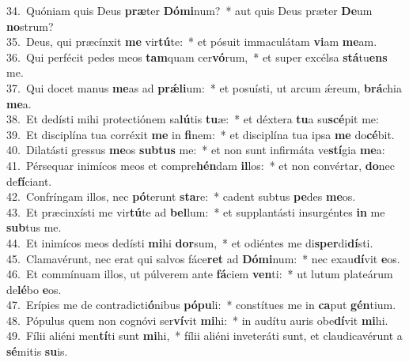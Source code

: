{34.~}Quóniam quis Deus \textbf{præ}ter \textbf{Dó}\textbf{mi}num?~* aut quis Deus præter \textbf{De}um \textbf{no}strum?\\
{35.~}Deus, qui præcínxit \textbf{me} vir\textbf{tú}te:~* et pósuit immaculátam \textbf{vi}am \textbf{me}am.\\
{36.~}Qui perfécit pedes meos \textbf{tam}quam cer\textbf{vó}rum,~* et super excélsa \textbf{stá}tu\textbf{ens} me.\\
{37.~}Qui docet manus \textbf{me}as ad \textbf{prǽ}\textbf{li}um:~* et posuísti, ut arcum ǽreum, \textbf{brá}chia \textbf{me}a.\\
{38.~}Et dedísti mihi protectiónem sa\textbf{lú}tis \textbf{tu}æ:~* et déxtera \textbf{tu}a su\textbf{scé}pit me:\\
{39.~}Et disciplína tua corréxit \textbf{me} in \textbf{fi}nem:~* et disciplína tua ipsa \textbf{me} do\textbf{cé}bit.\\
{40.~}Dilatásti gressus \textbf{me}os \textbf{sub}\textbf{tus} me:~* et non sunt infirmáta ve\textbf{stí}gia \textbf{me}a:\\
{41.~}Pérsequar inimícos meos et compre\textbf{hén}dam \textbf{il}los:~* et non convértar, \textbf{do}nec de\textbf{fí}ciant.\\
{42.~}Confríngam illos, nec \textbf{pó}terunt \textbf{sta}re:~* cadent subtus \textbf{pe}des \textbf{me}os.\\
{43.~}Et præcinxísti me vir\textbf{tú}te ad \textbf{bel}lum:~* et supplantásti insurgéntes \textbf{in} me \textbf{sub}tus me.\\
{44.~}Et inimícos meos dedísti \textbf{mi}hi \textbf{dor}sum,~* et odiéntes me di\textbf{sper}di\textbf{dí}sti.\\
{45.~}Clamavérunt, nec erat qui salvos fáce\textbf{ret} ad \textbf{Dó}\textbf{mi}num:~* nec exau\textbf{dí}vit \textbf{e}os.\\
{46.~}Et commínuam illos, ut púlverem ante \textbf{fá}ciem \textbf{ven}ti:~* ut lutum plateárum de\textbf{lé}bo \textbf{e}os.\\
{47.~}Erípies me de contradicti\textbf{ó}nibus \textbf{pó}\textbf{pu}li:~* constítues me in \textbf{ca}put \textbf{gén}tium.\\
{48.~}Pópulus quem non cognóvi ser\textbf{ví}vit \textbf{mi}hi:~* in audítu auris obe\textbf{dí}vit \textbf{mi}hi.\\
{49.~}Fílii aliéni men\textbf{tí}ti sunt \textbf{mi}hi,~* fílii aliéni inveteráti sunt, et claudicavérunt a \textbf{sé}mitis \textbf{su}is.\\
